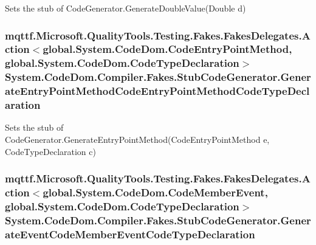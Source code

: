 Sets the stub of Code\-Generator.\-Generate\-Double\-Value(\-Double d)

\hypertarget{class_system_1_1_code_dom_1_1_compiler_1_1_fakes_1_1_stub_code_generator_a69ed4deb3eb2157e9188b28fbc1cc63c}{
\subsubsection[{Generate\-Entry\-Point\-Method\-Code\-Entry\-Point\-Method\-Code\-Type\-Declaration}]{\setlength{\rightskip}{0pt plus 5cm}mqttf.\-Microsoft.\-Quality\-Tools.\-Testing.\-Fakes.\-Fakes\-Delegates.\-Action$<$global.\-System.\-Code\-Dom.\-Code\-Entry\-Point\-Method, global.\-System.\-Code\-Dom.\-Code\-Type\-Declaration$>$ System.\-Code\-Dom.\-Compiler.\-Fakes.\-Stub\-Code\-Generator.\-Generate\-Entry\-Point\-Method\-Code\-Entry\-Point\-Method\-Code\-Type\-Declaration}}\label{class_system_1_1_code_dom_1_1_compiler_1_1_fakes_1_1_stub_code_generator_a69ed4deb3eb2157e9188b28fbc1cc63c}


Sets the stub of Code\-Generator.\-Generate\-Entry\-Point\-Method(\-Code\-Entry\-Point\-Method e, Code\-Type\-Declaration c)

\hypertarget{class_system_1_1_code_dom_1_1_compiler_1_1_fakes_1_1_stub_code_generator_a7804e88dd48a312bd6b4e0d25612222b}{
\subsubsection[{Generate\-Event\-Code\-Member\-Event\-Code\-Type\-Declaration}]{\setlength{\rightskip}{0pt plus 5cm}mqttf.\-Microsoft.\-Quality\-Tools.\-Testing.\-Fakes.\-Fakes\-Delegates.\-Action$<$global.\-System.\-Code\-Dom.\-Code\-Member\-Event, global.\-System.\-Code\-Dom.\-Code\-Type\-Declaration$>$ System.\-Code\-Dom.\-Compiler.\-Fakes.\-Stub\-Code\-Generator.\-Generate\-Event\-Code\-Member\-Event\-Code\-Type\-Declaration}}\label{class_system_1_1_code_dom_1_1_compiler_1_1_fakes_1_1_stub_code_generator_a7804e88dd48a312bd6b4e0d25612222b}


